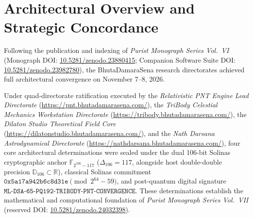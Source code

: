 \documentclass[11pt,a4paper,reqno]{article}
\theoremstyle{plain}
\theoremstyle{definition}
\theoremstyle{remark}
\numberwithin{equation}{section}
\numberwithin{table}{section}
\newcommand{\Ddd}{\mathbb{D}_{106}}
\begin{document}
\clearpage
\tableofcontents
\clearpage

\section{Architectural Overview and Strategic Concordance}
\label{sec:executive_concordance}

{\raggedright
Following the publication and indexing of \emph{Purist Monograph Series Vol.~VI} (Monograph DOI: \href{https://doi.org/10.5281/zenodo.23880415}{10.5281/zenodo.23880415}; Companion Software Suite DOI: \href{https://doi.org/10.5281/zenodo.23982780}{10.5281/zenodo.23982780}), the BhutaDamaraSena research directorates achieved full architectural convergence on November 7--8, 2026.\par}

Under quad-directorate ratification executed by the \emph{Relativistic PNT Engine Lead Directorate} (\url{https://pnt.bhutadamarasena.com/}), the \emph{TriBody Celestial Mechanics Workstation Directorate} (\url{https://tribody.bhutadamarasena.com/}), the \emph{Dilaton Studio Theoretical Field Core} (\url{https://dilatonstudio.bhutadamarasena.com/}), and the \emph{Nath Darsana Astrodynamical Directorate} (\url{https://nathdarsana.bhutadamarasena.com/}), four core architectural determinations were sealed under the dual 106-bit Solinas cryptographic anchor $\mathbb{F}_{2^{106}-117}$ ($\Delta_{106} = 117$, alongside host double-double precision $\Ddd \subset \mathbb{R}$), classical Solinas commitment $\mathtt{0x5a17a942b6c8d31e} \pmod{2^{64}-59}$, and post-quantum digital signature $\mathtt{ML\text{-}DSA\text{-}65\text{-}PQ192\text{-}TRIBODY\text{-}PNT\text{-}CONVERGENCE}$. These determinations establish the mathematical and computational foundation of \emph{Purist Monograph Series Vol.~VII} (reserved DOI: \href{https://doi.org/10.5281/zenodo.24032398}{10.5281/zenodo.24032398}).
\end{document}
